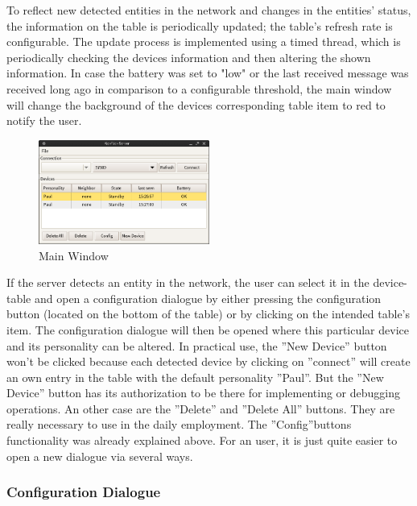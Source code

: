 To reflect new detected entities in the network and changes in the entities' status, the information on the table is periodically updated; the table's refresh rate is configurable. 
The update process is implemented using a timed thread, which is periodically checking the devices information and then altering the shown information. In case the battery was set to "low" or the last received message was received long ago in comparison to a configurable threshold, the main window will change the background of the devices corresponding table item to red to notify the user. 
\begin{figure}[h!]
 \centering
 \includegraphics[width= 0.5\textwidth, clip=true  ,keepaspectratio=true]{./pic/java-server-main.png}
 \caption{Main Window}
 \label{java-server-main}
\end{figure}

If the server detects an entity in the network, the user can select it in the device-table and open a configuration dialogue by either pressing the configuration button (located on the bottom of the table) or by clicking on the intended table's item. The configuration dialogue will then be opened where this particular device and its personality can be altered.
In practical use, the ''New Device'' button won't be clicked because each detected device by clicking on ''connect'' will create an own entry in the table with the default personality ''Paul''. But the ''New Device'' button has its authorization to be there for implementing or debugging operations.\newline
An other case are the ''Delete'' and ''Delete All'' buttons. They are really necessary to use in the daily employment. The ''Config''buttons functionality was already explained above. For an user, it is just quite easier to open a new dialogue via several ways.

\subsubsection{Configuration Dialogue}

